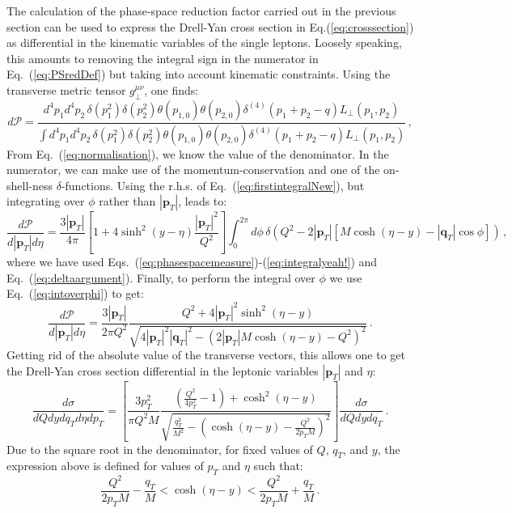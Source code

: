 \documentclass[10pt,a4paper]{article}
\begin{document}
The calculation of the phase-space reduction factor carried out in the
previous section can be used to express the Drell-Yan cross section in
Eq.(\ref{eq:crosssection}) as differential in the kinematic variables
of the single leptons. Loosely speaking, this amounts to removing the
integral sign in the numerator in Eq.~(\ref{eq:PSredDef}) but taking
into account kinematic constraints. Using the transverse metric tensor
$g_\perp^{\mu\nu}$, one finds:
\begin{equation}
d\mathcal{P} = \frac{\displaystyle d^4p_1 d^4p_2 \,\delta(p_1^2) \delta(p_2^2)\theta(p_{1,0}) \theta(p_{2,0})\delta^{(4)}(p_1+p_2-q) L_\perp(p_1,p_2)}{\displaystyle \int d^4p_1 d^4p_2\, \delta(p_1^2) \delta(p_2^2) \theta(p_{1,0}) \theta(p_{2,0})\delta^{(4)}(p_1+p_2-q) L_\perp(p_1,p_2)}\,,
\end{equation}
From Eq.~(\ref{eq:normalisation}), we know the value of the
denominator. In the numerator, we can make use of the
momentum-conservation and one of the on-shell-ness
$\delta$-functions. Using the r.h.s. of
Eq.~(\ref{eq:firstintegralNew}), but integrating over $\phi$ rather
than $|\mathbf{p}_T|$, leads to:
\begin{equation}
\frac{d\mathcal{P}}{d|\mathbf{p}_T|d\eta} = \frac {3 |\mathbf{p}_T|}{4\pi}\left[1+4 \sinh^2(y-\eta)\frac{|\mathbf{p}_T|^2}{Q^2}\right]
 \int_0^{2\pi} d\phi\,\delta(Q^2-2 |\mathbf{p}_T|\left[M\cosh\left(\eta - y\right)-|\mathbf{q}_T|\cos\phi\right])\,,
\end{equation}
where we have used
Eqs.~(\ref{eq:phasespacemeasure})-(\ref{eq:integralyeah!}) and
Eq.~(\ref{eq:deltaargument}). Finally, to perform the integral over
$\phi$ we use Eq.~(\ref{eq:intoverphi}) to get:
\begin{equation}
\frac{d\mathcal{P}}{d|\mathbf{p}_T|d\eta} = \frac {3|\mathbf{p}_T|}{2\pi Q^2}
 \frac{Q^2+4 |\mathbf{p}_T|^2 \sinh^2(\eta-y)}{\sqrt{4|\mathbf{p}_T|^2|\mathbf{q}_T|^2-(2|\mathbf{p}_T|M\cosh(\eta-y)-Q^2)^2}}\,.
\end{equation}
Getting rid of the absolute value of the transverse vectors, this
allows one to get the Drell-Yan cross section differential in the
leptonic variables $|\mathbf{p}_T|$ and $\eta$:
\begin{equation}
\frac{d\sigma}{dQ dy dq_T d\eta dp_T} =
                                                          \left[\frac
                                                          {3p_T^2}{\pi
                                                          Q^2 M}\frac{\left(\frac{Q^2}{4 p_T^2}-1\right)+\cosh^2(\eta-y)}{\sqrt{\frac{q_T^2}{M^2}-\left(\cosh(\eta-y)-\frac{Q^2}{2p_TM}\right)^2}}\right]\frac{d\sigma}{dQ dy dq_T}\,.
\end{equation}
Due to the square root in the denominator, for fixed values of $Q$,
$q_T$, and $y$, the expression above is defined for values of $p_T$
and $\eta$ such that:
\begin{equation}\label{eq:kinconstr}
\frac{Q^2}{2p_TM}-\frac{q_T }{M}< \cosh(\eta-y) < \frac{Q^2}{2p_TM}+\frac{q_T}{M}\,.
\end{equation}
\end{document}
